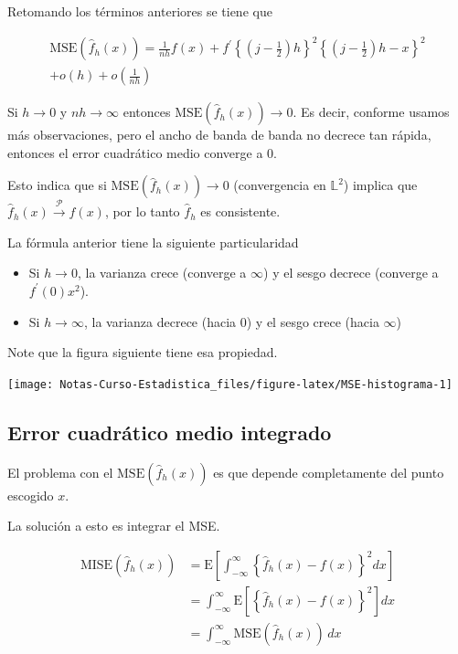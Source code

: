 \documentclass[
  12pt,
]{book}
\providecommand{\tightlist}{%
  \setlength{\itemsep}{0pt}\setlength{\parskip}{0pt}}
\theoremstyle{definition}
\theoremstyle{definition}
\theoremstyle{definition}
\theoremstyle{remark}
\let\BeginKnitrBlock\begin \let\EndKnitrBlock\end
\begin{document}
Retomando los términos anteriores se tiene que

\begin{multline*}
\mathrm{MSE}\left( \hat{f}_h(x)\right) =
\frac{1}{nh} f(x) + f^\prime
\left\{
\left(
j - \frac{1}{2}
\right) h
\right\}^2
\left\{
\left(
j - \frac{1}{2}
\right) h - x
\right\}^2 \\
+ o\left(h \right) +        o\left(\frac{1}{nh} \right)
\end{multline*}

\BeginKnitrBlock{remark}
{}Si \(h \to 0\) y \(nh \to \infty\) entonces \(\mathrm{MSE}\left( \hat{f}_h(x)\right) \to 0\). Es decir, conforme usamos más observaciones, pero el ancho de banda de banda no decrece tan rápida, entonces el error cuadrático medio converge a 0.

Esto indica que si \(\mathrm{MSE}\left( \hat{f}_h(x)\right) \to 0\) (convergencia en \(\mathbb{L}^2\)) implica que \(\hat{f}_h(x) \stackrel{\mathcal{P}}{\to} f(x)\), por lo tanto \(\hat{f}_h\) es consistente.
\EndKnitrBlock{remark}

La fórmula anterior tiene la siguiente particularidad

\begin{itemize}
\tightlist
\item
  Si \(h\to 0\), la varianza crece (converge a \(\infty\)) y el sesgo decrece (converge a \(f^\prime (0)x^2\)).
\item
  Si \(h\to \infty\), la varianza decrece (hacia 0) y el sesgo crece (hacia \(\infty\))
\end{itemize}

Note que la figura siguiente tiene esa propiedad.

\begin{center}\texttt{[image: Notas-Curso-Estadistica\_files/figure-latex/MSE-histograma-1]} \end{center}

\hypertarget{error-cuadruxe1tico-medio-integrado}{%
\subsection{Error cuadrático medio integrado}\label{error-cuadruxe1tico-medio-integrado}}

El problema con el \(\mathrm{MSE}\left( \hat{f}_h(x)\right)\) es que depende completamente del punto escogido \(x\).

La solución a esto es integrar el MSE.

\begin{align*}
\mathrm{MISE}\left(  \hat{f}_h(x)\right)
& = \mathrm{E}\left[
\int_{ -\infty}^{\infty} \left\{
\hat{f}_h(x) - f(x)
\right\}^2 dx
\right]                                                       \\
& = \int_{ -\infty}^{\infty} \mathrm{E}\left[
\left\{
\hat{f}_h(x) - f(x)
\right\}^2
\right] dx                                                    \\
& = \int_{ -\infty}^{\infty}\mathrm{MSE}(\hat{f}_h(x)) \, dx
\end{align*}
\end{document}
